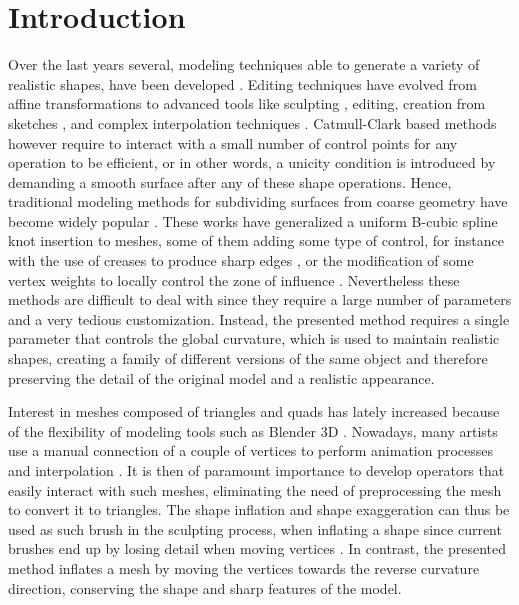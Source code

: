 \documentclass[10pt, conference]{IEEEtran}
\begin{document}
\IEEEpeerreviewmaketitle

\section{Introduction}
%
Over the last years several, modeling techniques able to generate
a variety of realistic shapes, have been developed \cite{Botsch2006}.
Editing techniques have evolved from affine transformations to advanced
tools like sculpting \cite{Coquillart1990,Galyean1991,Stanculescu2011},
editing, creation from sketches \cite{Igarashi1999,Gonen2012}, and
complex interpolation techniques \cite{Sorkine2004,Zhou2005}. Catmull-Clark
based methods however require to interact with a small number of
control points for any operation to be efficient, or in other words,
a unicity condition is introduced by demanding a smooth surface after
any of these shape operations. Hence, traditional modeling methods
for subdividing surfaces from coarse geometry have become widely popular
\cite{Catmull1978,Stam1998}. These works have generalized a uniform
B-cubic spline knot insertion to meshes, some of them adding some
type of control, for instance with the use of creases to produce sharp
edges \cite{DeRose1998}, or the modification of some vertex weights
to locally control the zone of influence \cite{Biermann2000}. Nevertheless
these methods are difficult to deal with since they require a large
number of parameters and a very tedious customization. Instead, the
presented method requires a single parameter that controls the global
curvature, which is used to maintain realistic shapes, creating a
family of different versions of the same object and therefore preserving
the detail of the original model and a realistic appearance. 

Interest in meshes composed of triangles and quads has lately increased
because of the flexibility of modeling tools such as Blender 3D \cite{blender}.
Nowadays, many artists use a manual connection of a couple of vertices
to perform animation processes and interpolation \cite{Mullen2007}.
It is then of paramount importance to develop operators that easily
interact with such meshes, eliminating the need of preprocessing the
mesh to convert it to triangles. The shape inflation and shape exaggeration
can thus be used as such brush in the sculpting process, when inflating
a shape since current brushes end up by losing detail when moving
vertices \cite{Stanculescu2011}. In contrast, the presented method
inflates a mesh by moving the vertices towards the reverse curvature
direction, conserving the shape and sharp features of the model.
\end{document}
